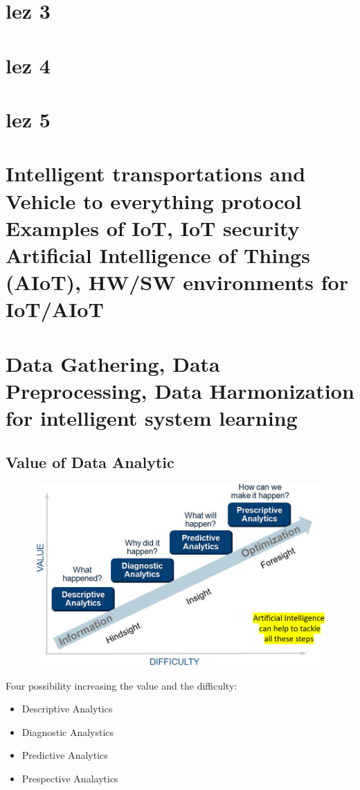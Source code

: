 \documentclass{report}
\begin{document}
\chapter{lez 3}

\chapter{lez 4}

\chapter{lez 5}


\chapter{Intelligent transportations and Vehicle to everything protocol Examples of IoT, IoT security Artificial Intelligence of Things (AIoT), HW/SW environments for IoT/AIoT}


\chapter{Data Gathering, Data Preprocessing, Data Harmonization for intelligent system learning}

\section{Value of Data Analytic}
\begin{figure}[H]
    \centering
    \includegraphics[width=0.8\linewidth]{images/Data.png}
\end{figure}

Four possibility increasing the value and the difficulty:
\begin{itemize}
    \item Descriptive Analytics
    \item Diagnostic Analystics
    \item Predictive Analytics
    \item Prespective Analaytics
\end{itemize}
\end{document}
